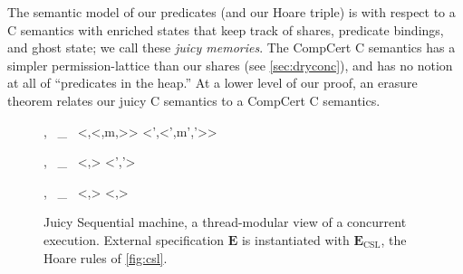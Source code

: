 The semantic model of our predicates (and our Hoare triple) is
with respect to a C semantics with enriched states that keep
track of shares, predicate bindings, and ghost state; we call these
\emph{juicy memories}.  The CompCert C semantics
has a simpler permission-lattice than our shares
(see \autoref{sec:dryconc}), and has no notion at all
of ``predicates in the heap.''  
At a lower level of our proof, 
an erasure theorem relates our juicy C semantics to a
CompCert C semantics.


\begin{figure}[t]
\vspace{-3ex}
\noindent{}
  {
, \Psi ~\vdash_~ \left<\sigma,\left<\phi,m,\mu\right>\right> \mapsto \left<\sigma',\left<\phi',m',\mu'\right>\right>
  }

\vspace{-1ex}
\noindent{}
 {
, \Psi ~\vdash_~
\left<\sigma,\right> \mapsto
\left<\sigma','\right>
} 

\vspace{-1ex}
\noindent{}
 {
, \Psi ~\vdash_~
\left<\sigma,\right> \mapsto
\left<\sigma,\right>
} 


\caption[Juicy Sequential machine]{Juicy Sequential machine, a thread-modular view of a
  concurrent execution.  External specification $\mathbf{E}$
  is instantiated with $\mathbf{E}_\mathrm{CSL}$, the Hoare rules of \autoref{fig:csl}.
}
\label{fig:juicyseq}
\end{figure}

